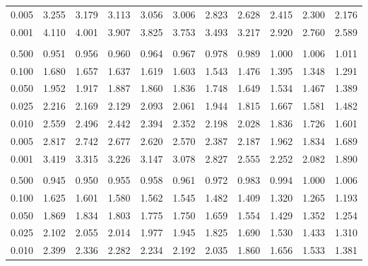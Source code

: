 \documentclass[
]{article}
\begin{document}
\begin{longtable}[t]{lrrrrrrrrrr}
\hspace{1em}0.005 & 3.255 & 3.179 & 3.113 & 3.056 & 3.006 & 2.823 & 2.628 & 2.415 & 2.300 & 2.176\\
\hspace{1em}0.001 & 4.110 & 4.001 & 3.907 & 3.825 & 3.753 & 3.493 & 3.217 & 2.920 & 2.760 & 2.589\\
\addlinespace[0.3em]
\multicolumn{11}{l}{\textbf{$k_2=60$}}\\
\hspace{1em}0.500 & 0.951 & 0.956 & 0.960 & 0.964 & 0.967 & 0.978 & 0.989 & 1.000 & 1.006 & 1.011\\
\hspace{1em}0.100 & 1.680 & 1.657 & 1.637 & 1.619 & 1.603 & 1.543 & 1.476 & 1.395 & 1.348 & 1.291\\
\hspace{1em}0.050 & 1.952 & 1.917 & 1.887 & 1.860 & 1.836 & 1.748 & 1.649 & 1.534 & 1.467 & 1.389\\
\hspace{1em}0.025 & 2.216 & 2.169 & 2.129 & 2.093 & 2.061 & 1.944 & 1.815 & 1.667 & 1.581 & 1.482\\
\hspace{1em}0.010 & 2.559 & 2.496 & 2.442 & 2.394 & 2.352 & 2.198 & 2.028 & 1.836 & 1.726 & 1.601\\
\hspace{1em}0.005 & 2.817 & 2.742 & 2.677 & 2.620 & 2.570 & 2.387 & 2.187 & 1.962 & 1.834 & 1.689\\
\hspace{1em}0.001 & 3.419 & 3.315 & 3.226 & 3.147 & 3.078 & 2.827 & 2.555 & 2.252 & 2.082 & 1.890\\
\addlinespace[0.3em]
\multicolumn{11}{l}{\textbf{$k_2=120$}}\\
\hspace{1em}0.500 & 0.945 & 0.950 & 0.955 & 0.958 & 0.961 & 0.972 & 0.983 & 0.994 & 1.000 & 1.006\\
\hspace{1em}0.100 & 1.625 & 1.601 & 1.580 & 1.562 & 1.545 & 1.482 & 1.409 & 1.320 & 1.265 & 1.193\\
\hspace{1em}0.050 & 1.869 & 1.834 & 1.803 & 1.775 & 1.750 & 1.659 & 1.554 & 1.429 & 1.352 & 1.254\\
\hspace{1em}0.025 & 2.102 & 2.055 & 2.014 & 1.977 & 1.945 & 1.825 & 1.690 & 1.530 & 1.433 & 1.310\\
\hspace{1em}0.010 & 2.399 & 2.336 & 2.282 & 2.234 & 2.192 & 2.035 & 1.860 & 1.656 & 1.533 & 1.381\\

\end{longtable}
\end{document}
